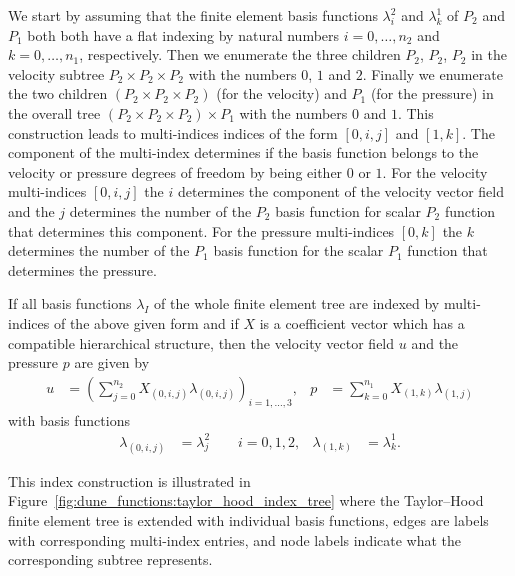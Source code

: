\documentclass[a4paper,10pt,headings=normal,bibliography=totoc]{scrartcl}
\begin{document}
We start by assuming that the finite element basis functions $\lambda_i^2$ and $\lambda_k^1$
of $P_2$ and $P_1$ both
both have a flat indexing by natural numbers $i=0,\dots,n_2$ and $k=0,\dots,n_1$,
respectively.
Then we enumerate the three children $P_2$, $P_2$, $P_2$
in the velocity subtree $P_2 \times P_2 \times P_2$
with the numbers $0$, $1$ and $2$.
Finally we enumerate the two children $(P_2 \times P_2 \times P_2)$ (for the velocity)
and $P_1$ (for the pressure) in the overall tree $(P_2 \times P_2 \times P_2) \times P_1$
with the numbers $0$ and $1$.
This construction leads to multi-indices indices of the form $[0,i,j]$ and $[1,k]$.
The component of the multi-index determines if the basis function
belongs to the velocity or pressure degrees of freedom by being either $0$ or $1$.
For the velocity multi-indices $[0,i,j]$ the $i$ determines the component
of the velocity vector field and the $j$ determines the number of the $P_2$ basis
function for scalar $P_2$ function that determines this component.
For the pressure multi-indices $[0,k]$ the $k$ determines the number of the $P_1$ basis
function for the scalar $P_1$ function that determines the pressure.

If all basis functions $\lambda_I$ of the whole finite element tree are
indexed by multi-indices of the above given form
and if $X$ is a coefficient vector which has a compatible hierarchical structure,
then the velocity vector field $u$ and the pressure $p$ are given by
\begin{align*}
    u &= (\sum_{j=0}^{n_2} X_{(0,i,j)}\lambda_{(0,i,j)})_{i=1,\dots,3},  &
    p &= \sum_{k=0}^{n_1} X_{(1,k)}\lambda_{(1,j)}
\end{align*}
with basis functions
\begin{align*}
    \lambda_{(0,i,j)} &= \lambda^2_j \qquad i=0,1,2, &
    \lambda_{(1,k)} &= \lambda^1_k.
\end{align*}

This index construction is illustrated in Figure~\ref{fig:dune_functions:taylor_hood_index_tree}
where the Taylor--Hood finite element tree is extended with individual basis functions,
edges are labels with corresponding multi-index entries, and node labels indicate
what the corresponding subtree represents.
\end{document}
